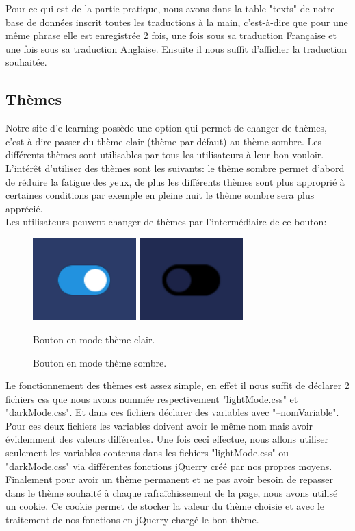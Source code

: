 \documentclass[a4paper,10pt]{article}
\begin{document}
Pour ce qui est de la partie pratique, nous avons dans la table "texts" de notre base de données inscrit toutes les traductions à la main, c'est-à-dire que pour une même phrase elle est enregistrée 2 fois, une fois sous sa traduction Française et une fois sous sa traduction Anglaise. Ensuite il nous suffit d'afficher la traduction souhaitée.

\subsection{Thèmes}
Notre site d'e-learning possède une option qui permet de changer de thèmes, c'est-à-dire passer du thème clair (thème par défaut) au thème sombre. Les différents thèmes sont utilisables par tous les utilisateurs à leur bon vouloir. L'intérêt d'utiliser des thèmes sont les suivants: le thème sombre permet d’abord de réduire la fatigue des yeux, de plus les différents thèmes sont plus approprié à certaines conditions par exemple en pleine nuit le thème sombre sera plus apprécié.\\

Les utilisateurs peuvent changer de thèmes par l'intermédiaire de ce bouton:
\begin{figure}[!h]
\centerline{
    \includegraphics[width=4cm]{images/boutonThemeClaire.PNG}
    \includegraphics[width=4cm]{images/boutonThemeSombre.PNG}
}
\caption{Bouton en mode thème clair.}
\caption{Bouton en mode thème sombre.}
\label{fig}
\end{figure}

Le fonctionnement des thèmes est assez simple, en effet il nous suffit de déclarer 2 fichiers css que nous avons nommée respectivement "lightMode.css" et "darkMode.css". Et dans ces fichiers déclarer des variables avec "--nomVariable". Pour ces deux fichiers les variables doivent avoir le même nom mais avoir évidemment des valeurs différentes. Une fois ceci effectue, nous allons utiliser seulement les variables contenus dans les fichiers "lightMode.css" ou "darkMode.css" via différentes fonctions jQuerry créé par nos propres moyens. Finalement pour avoir un thème permanent et ne pas avoir besoin de repasser dans le thème souhaité à chaque rafraîchissement de la page, nous avons utilisé un cookie. Ce cookie permet de stocker la valeur du thème choisie et avec le traitement de nos fonctions en jQuerry chargé le bon thème.
\end{document}

